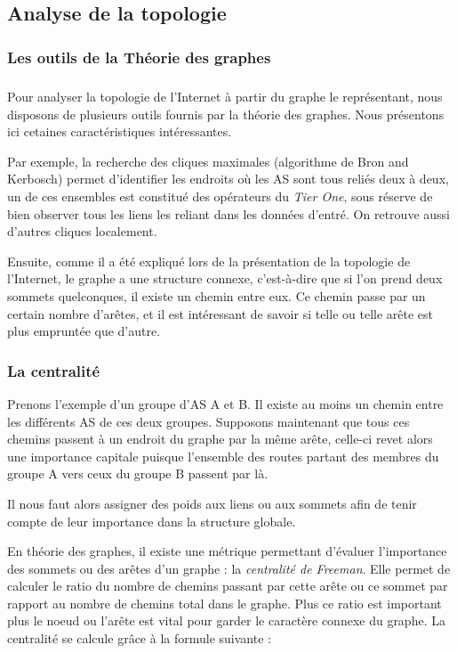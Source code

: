 

%

\subsection{Analyse de la topologie}

\subsubsection{Les outils de la Th\'eorie des graphes}
\subparagraph{}
Pour analyser la topologie de l'Internet \`a partir du graphe le repr\'esentant, nous disposons de plusieurs outils fournis par la th\'eorie des graphes. Nous pr\'esentons ici cetaines caract\'eristiques int\'eressantes.

Par exemple, la recherche des cliques maximales (algorithme de Bron and Kerbosch) permet d'identifier les endroits o\`u les AS sont tous reli\'es deux \`a deux, un de ces ensembles est constitu\'e des op\'erateurs du \textit{Tier One}, sous r\'eserve de bien observer tous les liens les reliant dans les donn\'ees d'entr\'e. On retrouve aussi d'autres cliques localement.
\par
Ensuite, comme il a été expliqu\'e lors de la pr\'esentation de la topologie de l'Internet, le graphe a une structure connexe, c'est-\`a-dire que si l'on prend deux sommets quelconques, il existe un chemin entre eux.
Ce chemin passe par un certain nombre d'ar\^etes, et il est int\'eressant de savoir si telle ou telle ar\^ete est plus emprunt\'ee que d'autre.

\subsubsection{La centralit\'e}

\par
Prenons l'exemple d'un groupe d'AS A et B. Il existe au moins un chemin entre les diff\'erents AS de ces deux groupes. Supposons maintenant que tous ces chemins passent \`a un endroit du graphe par la m\^eme ar\^ete, celle-ci revet alors une importance capitale puisque l'ensemble des routes partant des membres du groupe A vers ceux du groupe B passent par l\`a.
\par
Il nous faut alors assigner des poids aux liens ou aux sommets afin de tenir compte de leur importance dans la structure globale.

\par
En th\'eorie des graphes, il existe une m\'etrique permettant d'\'evaluer l'importance des sommets ou des ar\^etes d'un graphe : la \textit{centralit\'e de Freeman}. Elle permet de calculer le ratio du nombre de chemins passant par cette ar\^ete ou ce sommet par rapport au nombre de chemins total dans le graphe. Plus ce ratio est important plus le noeud ou l'ar\^ete est vital pour garder le caract\`ere connexe du graphe. La centralit\'e se calcule gr\^ace \`a la formule suivante :

